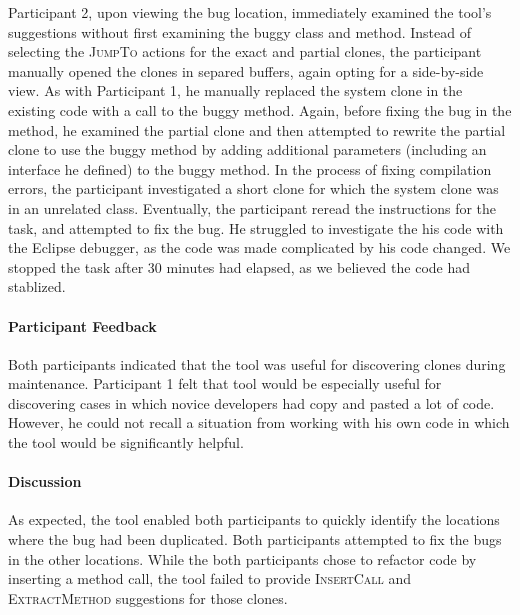 \documentclass[nocopyrightspace,10pt]{sigplanconf}
\newcommand{\todo}[1]{{\bfseries [[#1]]}}
\renewcommand{\todo}[1]{\relax}
\begin{document}
Participant 2, upon viewing the bug location, immediately examined the
tool's suggestions without first examining the buggy class and method.
Instead of selecting the \textsc{JumpTo} actions for the exact and
partial clones, the participant manually opened the clones in separed
buffers, again opting for a side-by-side view. As with Participant 1,
he manually replaced the system clone in the existing code with a call
to the buggy method. Again, before fixing the bug in the method, he
examined the partial clone and then attempted to rewrite the partial
clone to use the buggy method by adding additional parameters
(including an interface he defined) to the buggy method. In the
process of fixing compilation errors, the participant investigated a
short clone for which the system clone was in an unrelated
class. Eventually, the participant reread the instructions for the
task, and attempted to fix the bug. He struggled to investigate the
his code with the Eclipse debugger, as the code was made complicated
by his code changed. We stopped the task after 30 minutes had elapsed,
as we believed the code had stablized.

\paragraph{Participant Feedback}
Both participants indicated that the tool was useful for discovering
clones during maintenance. Participant 1 felt that tool would be
especially useful for discovering cases in which novice developers had
copy and pasted a lot of code. However, he could not recall a
situation from working with his own code in which the tool would be
significantly helpful.

\paragraph{Discussion}
As expected, the tool enabled both participants to quickly identify
the locations where the bug had been duplicated. Both participants
attempted to fix the bugs in the other locations. 
While the both participants chose to refactor code by
inserting a method call, the tool failed to provide
\textsc{InsertCall} and \textsc{ExtractMethod} suggestions for those
clones. \todo{Why did this happen?}
\end{document}
